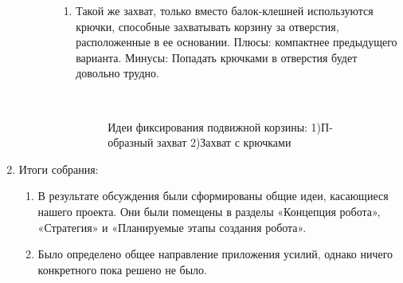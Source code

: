 \begin{enumerate}
\begin{enumerate}
\begin{enumerate}
\begin{enumerate}
          \item Такой же захват, только вместо балок-клешней используются крючки, способные захватывать корзину за отверстия, расположенные в ее основании. Плюсы: компактнее предыдущего варианта. Минусы: Попадать крючками в отверстия будет довольно трудно.
          
			\begin{figure}[H]
				\begin{minipage}[h]{0.2\linewidth}
					\center  
				\end{minipage}
				\begin{minipage}[h]{0.6\linewidth}
          		\caption{Идеи фиксирования подвижной корзины: 1)П-образный захват 2)Захват с крючками}
				\end{minipage}
			\end{figure}
          
        \end{enumerate}
      \end{enumerate}
    \end{enumerate}
    
	\item Итоги собрания: 
	\begin{enumerate}
	  \item В результате обсуждения были сформированы общие идеи, касающиеся нашего проекта. Они были помещены в разделы «Концепция робота»,  «Стратегия» и «Планируемые этапы создания робота».
	  
      \item Было определено общее направление приложения усилий, однако ничего конкретного пока решено не было.
      

\end{enumerate}
\end{enumerate}
